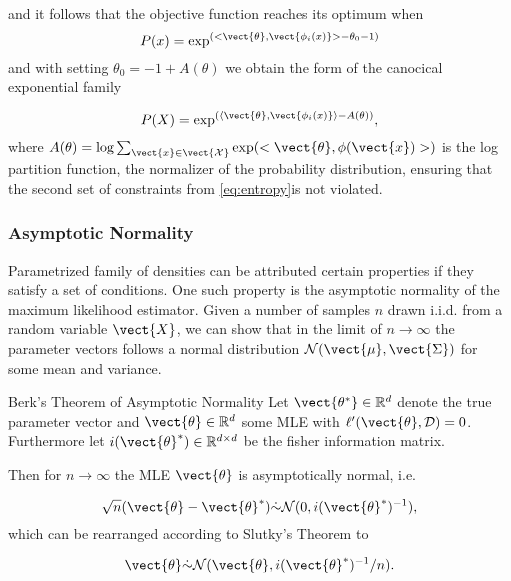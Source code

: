     and it follows that the objective function reaches its optimum when 
    \begin{equation}   
    P(x) = \exp^{(<\vect{\theta}, \vect{\phi_i(x)} > - \theta_0 - 1)}
    \end{equation} 
    and with setting $\theta_0 = -1 + A(\theta) $ we obtain the form of the canocical exponential family

    \begin{equation}
        P(X) = \exp^{(\langle\vect{\theta}, \vect{\phi_i(x)} \rangle - A(\theta))},
    \end{equation}
    where $A(\theta) = \log \sum_{\vect{x}\in \vect{\mathcal{X}}} \exp(<\vect{\theta}, \phi(\vect{x})>)$ is the log partition function, the normalizer of the probability distribution, ensuring that the second set of constraints from \eq\ref{eq:entropy}is not violated.

        \subsubsection{Asymptotic Normality}
        \label{ssec:asymp}
        Parametrized family of densities can be attributed certain properties if they satisfy a set of conditions. 
        One such property is the asymptotic normality of the maximum likelihood estimator.
        Given a number of samples $n$ drawn i.i.d. from a random variable $\vect{X}$, we can show that in the limit of $n \rightarrow \infty$ the parameter vectors follows a normal distribution $\mathcal{N}(\vect{\mu}, \vect{\Sigma})$ for some mean and variance.

        \begin{threm}{Berk's Theorem of Asymptotic Normality\cite{berk1972consistency}}
            Let $\vect{\theta^*} \in \mathbb{R}^d$ denote the true parameter vector and $\vect{\theta} \in \mathbb{R}^d$ some MLE with $\ell'(\vect{\theta}, \mathcal{D}) = 0$.
            Furthermore let $i(\vect{\theta}^*) \in \mathbb{R}^{d \times d}$ be the fisher information matrix.

            Then for $n \rightarrow \infty$ the MLE $\vect{\theta}$ is asymptotically normal, i.e.

            \begin{equation}
                \sqrt{n}(\vect{\theta} - \vect{\theta}^*) \dot{\sim} \mathcal{N}(0, i(\vect{\theta}^*)^{-1}),
            \end{equation}
            which can be rearranged according to Slutky's Theorem to

            \begin{equation}
                \vect{\theta} \dot{\sim} \mathcal{N}(\vect{\theta}, i(\vect{\theta}^*)^{-1}/n).
            \end{equation}
        \end{threm}

